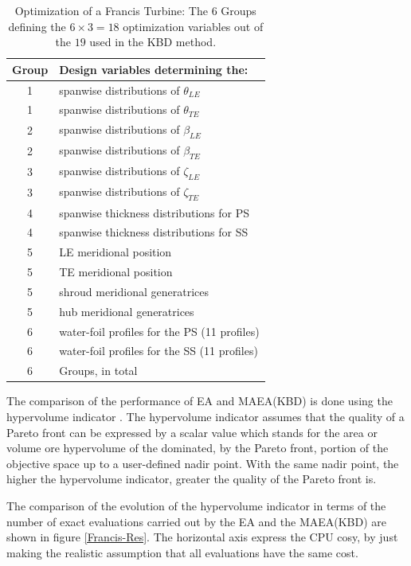 \begin{table}[h!]
\begin{center}
\begin{tabular}{ |c|l| }
\hline

Group              & Design variables determining the:\\
\hline
1 & spanwise distributions of $\theta_{LE}$\\
\hline
1 & spanwise distributions of $\theta_{TE}$\\
\hline
2 & spanwise distributions of $\beta_{LE}$\\
\hline
2 & spanwise distributions of $\beta_{TE}$\\
\hline
3 & spanwise distributions of $\zeta_{LE}$\\
\hline
3 & spanwise distributions of $\zeta_{TE}$\\
\hline
4 & spanwise thickness distributions for PS \\
\hline
4 & spanwise thickness distributions for SS\\
\hline
5 & LE meridional position\\
\hline
5 & TE meridional position\\
\hline
5 & shroud meridional generatrices \\
\hline
5 & hub meridional generatrices\\
\hline
6 & water-foil profiles for the PS (11 profiles)\\
\hline
6 & water-foil profiles  for the SS (11 profiles)\\
\hline
\hline
6 & Groups, in total \\
\hline   
\end{tabular}
\caption{
Optimization of a Francis Turbine: The $6$ Groups  defining the $6 \times 3=18$ optimization variables out of the $19$ used in the KBD method.}
\label{design_groups}
\end{center}
\end{table}

The comparison of the performance of EA and MAEA(KBD) is done using the hypervolume indicator \cite{Zitz2007}. The hypervolume indicator assumes that the quality of a Pareto front can be expressed by a scalar value which stands for the area or volume ore hypervolume of the dominated, by the Pareto front, portion of the objective space up to a user-defined nadir point. With the same nadir point, the higher the hypervolume indicator, greater the quality of the Pareto front is.

The comparison of the evolution of the hypervolume indicator in terms of the number of exact evaluations carried out by the EA and the MAEA(KBD) are shown in figure \ref{Francis-Res}. The horizontal axis express the CPU cosy, by just making the realistic assumption that all evaluations have the same cost. 


